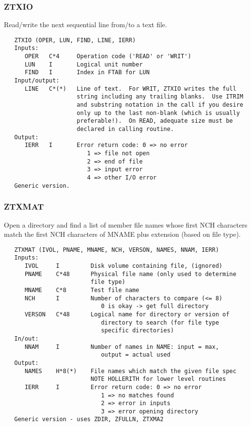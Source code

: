 \subsubsection{ZTXIO}
Read/write the next sequential line from/to a  text file.
\begin{verbatim}
   ZTXIO (OPER, LUN, FIND, LINE, IERR)
   Inputs:
      OPER   C*4     Operation code ('READ' or 'WRIT')
      LUN    I       Logical unit number
      FIND   I       Index in FTAB for LUN
   Input/output:
      LINE   C*(*)   Line of text.  For WRIT, ZTXIO writes the full
                     string including any trailing blanks.  Use ITRIM
                     and substring notation in the call if you desire
                     only up to the last non-blank (which is usually
                     preferable!).  On READ, adequate size must be
                     declared in calling routine.
   Output:
      IERR   I       Error return code: 0 => no error
                        1 => file not open
                        2 => end of file
                        3 => input error
                        4 => other I/O error
   Generic version.
\end{verbatim}

\subsubsection{ZTXMAT}
Open a directory and find a list of member file names whose first
NCH characters match the first NCH characters of MNAME plus
extension (based on file type).
\begin{verbatim}
   ZTXMAT (IVOL, PNAME, MNAME, NCH, VERSON, NAMES, NNAM, IERR)
   Inputs:
      IVOL     I         Disk volume containing file, (ignored)
      PNAME    C*48      Physical file name (only used to determine
                         file type)
      MNAME    C*8       Test file name
      NCH      I         Number of characters to compare (<= 8)
                            0 is okay -> get full directory
      VERSON   C*48      Logical name for directory or version of
                            directory to search (for file type
                            specific directories)
   In/out:
      NNAM     I         Number of names in NAME: input = max,
                            output = actual used
   Output:
      NAMES    H*8(*)    File names which match the given file spec
                         NOTE HOLLERITH for lower level routines
      IERR     I         Error return code: 0 => no error
                            1 => no matches found
                            2 => error in inputs
                            3 => error opening directory
   Generic version - uses ZDIR, ZFULLN, ZTXMA2
\end{verbatim}

